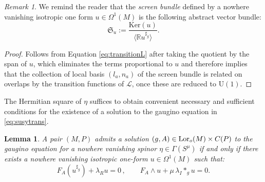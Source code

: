 \documentclass[10pt,a4paper,twoside,reqno]{amsart}
\theoremstyle{plain}
\newtheorem{lemma}[thm]{Lemma}
\theoremstyle{definition}
\theoremstyle{remark}
\newtheorem{remark}[thm]{Remark}
\def\U{\mathrm{U}}
\newcommand{\Lor}{{\rm Lor}}
\def\cL{\mathcal{L}}
\renewcommand{\ker}{\mathrm{Ker}}
\begin{document}
\begin{remark}
We remind the reader that the \emph{screen bundle} defined by a nowhere vanishing isotropic one form $u\in \Omega^1(M)$ is the following abstract vector bundle:
\begin{equation*}
\mathfrak{S}_u := \frac{\ker(u)}{\langle \mathbb{R} u^{\sharp_g}\rangle}.
\end{equation*}
\end{remark}
 
\begin{proof}
Follows from Equation \eqref{eq:transitionL} after taking the quotient by the span of $u$, which eliminates the terms proportional to $u$ and therefore implies that the collection of local basis $(l_a,n_a)$ of the screen bundle is related on overlaps by the transition functions of $\cL$, once these are reduced to $\U(1)$. 
\end{proof}

\noindent
The Hermitian square of $\eta$ suffices to obtain convenient necessary and sufficient conditions for the existence of a solution to the gaugino equation in \eqref{eq:susytrans}.

\begin{lemma}
A pair $(M,P)$ admits a solution $(g,A)\in \Lor_o(M)\times C(P)$ to the gaugino equation for a nowhere vanishing spinor $\eta\in \Gamma(S^{\mu})$ if and only if there exists a nowhere vanishing isotropic one-form $u\in \Omega^1(M)$ such that:
\begin{equation}
\label{eq:Asugra}
F_A(u^{\sharp_g}) + \lambda_R u =  0\, , \qquad F_A\wedge u + \mu\,  \lambda_I \ast_g u = 0.
\end{equation}
\end{lemma}
\end{document}
